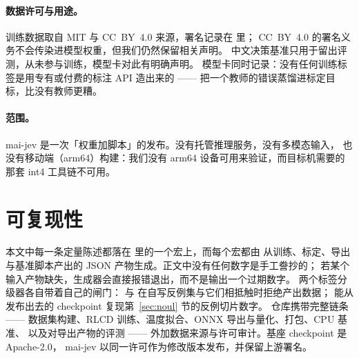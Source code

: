 \documentclass[11pt,a4paper]{article}
\begin{document}
\paragraph{数据许可与用途。} 训练数据取自 MIT 与 CC~BY~4.0 来源，署名记录在  里；
CC~BY~4.0 的署名义务不会传染进模型权重，但我们仍然保留相关声明。
中文决策基准只用于留出评测，从未参与训练，模型卡对此有明确声明。
模型卡同时记录：没有任何训练标签是用专有或付费的标注 API 造出来的 ——
把一个教师的错误蒸馏进标定目标，比没有教师更糟。

\paragraph{范围。} mai-jev 是一次「权重加脚本」的发布。没有托管推理服务，没有多模态输入，
也没有移动端（arm64）构建：我们没有 arm64 设备可用来验证，而目标机需要的那套 int4 工具链不可用。

\section{可复现性}

本文中每一条定量陈述都落在  里的一个宏上，而每个宏都由 
从训练、标定、导出与基准脚本产出的 JSON 产物生成。正文中没有任何数字是手工誊抄的；
若某个输入产物缺失，生成器会直接报错退出，而不是输出一个过期数字。
两个标签分级器各自带着自己的闸门： 与 
在自写反例集与它们相抵触时拒绝产出数据； 能从发布出去的 checkpoint 复现第~\ref{sec:noul} 节的反例切片数字。
仓库携带完整链条 —— 数据集构建、RLCD 训练、温度拟合、ONNX 导出与量化、打包、CPU 基准、
以及对导出产物的评测 —— 外加数据来源与许可审计。基座 checkpoint 是 Apache-2.0，
mai-jev 以同一许可作为修改版本发布，并保留上游署名。



\end{document}
